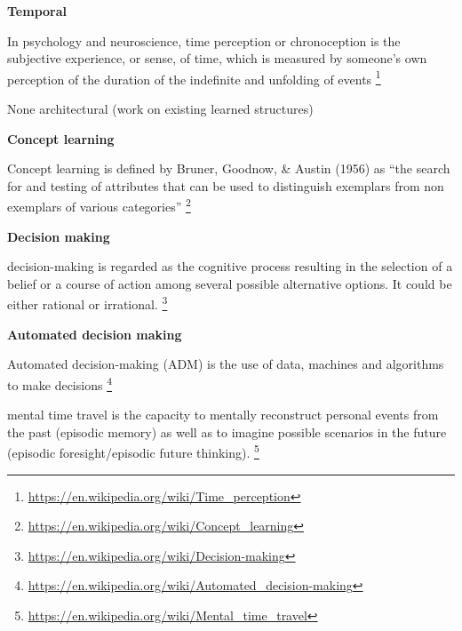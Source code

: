 \documentclass{book}
\providecommand{\ProjectDeepHeading}[2]{%
    \par\medskip\noindent\textbf{#2}\par\smallskip
}
\providecommand{\seeherefooter}[1]{\footnote{\url{#1}}}
\begin{document}
\ProjectDeepHeading{6}{Temporal}


In psychology and neuroscience, time perception or chronoception is the subjective experience, or sense, of time, which is measured by someone's own perception of the duration of the indefinite and unfolding of events \seeherefooter{https://en.wikipedia.org/wiki/Time_perception}


None architectural
    (work on existing learned
    structures)

\ProjectDeepHeading{4}{Concept learning}


Concept learning is defined by Bruner, Goodnow, \& Austin (1956) as ``the search for and testing of attributes that can be used to distinguish exemplars from non exemplars of various categories'' \seeherefooter{https://en.wikipedia.org/wiki/Concept_learning}

\ProjectDeepHeading{4}{Decision making}


decision-making is regarded as the cognitive process resulting in the selection of a belief or a course of action among several possible alternative options. It could be either rational or irrational.
    \seeherefooter{https://en.wikipedia.org/wiki/Decision-making}
    
    \ProjectDeepHeading{7}{Automated decision making}
        Automated decision-making (ADM) is the use of data, machines and algorithms to make decisions
        \seeherefooter{https://en.wikipedia.org/wiki/Automated_decision-making}


mental time travel is the capacity to mentally reconstruct personal events from the past (episodic memory) as well as to imagine possible scenarios in the future (episodic foresight/episodic future thinking). \seeherefooter{https://en.wikipedia.org/wiki/Mental_time_travel}
\end{document}
